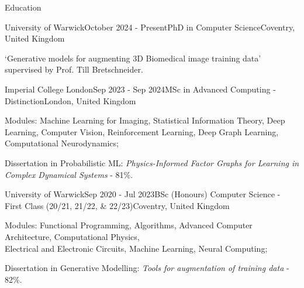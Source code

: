 \documentclass{resume}
\begin{document}
    \begin{rSection}{Education}
        \begin{rSubsection}{University of Warwick}{October 2024 - Present}{PhD in Computer Science}{Coventry, United Kingdom}{}
            \item `Generative models for augmenting 3D Biomedical image training data' supervised by Prof. Till Bretschneider.
        \end{rSubsection}
        \begin{rSubsection}{Imperial College London}{Sep 2023 - Sep 2024}{MSc in Advanced Computing - Distinction}{London, United Kingdom}{}
            \item Modules: Machine Learning for Imaging, Statistical Information Theory, Deep Learning, Computer Vision, Reinforcement Learning, Deep Graph Learning, Computational Neurodynamics; 
            \item Dissertation in Probabilistic ML: \emph{Physics-Informed Factor Graphs for Learning in Complex Dynamical Systems} - 81\%.
        \end{rSubsection}
        \begin{rSubsection}{University of Warwick}{Sep 2020 - Jul 2023}{BSc (Honours) Computer Science - First Class (20/21, 21/22, \& 22/23)}{Coventry, United Kingdom}{}
            \item Modules: Functional Programming, Algorithms, Advanced Computer Architecture, Computational Physics, \\Electrical and Electronic Circuits, Machine Learning, Neural Computing;
            \item Dissertation in Generative Modelling: \emph{Tools for augmentation of training data} - 82\%.
        \end{rSubsection}
    \end{rSection} 
\end{document}
